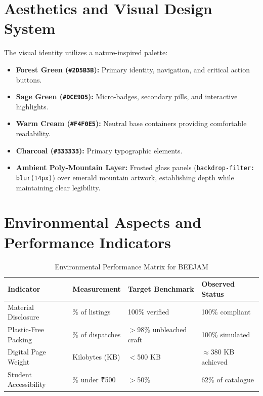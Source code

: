 \documentclass[11pt,a4paper]{article}
\begin{document}
\section{Aesthetics and Visual Design System}
The visual identity utilizes a nature-inspired palette:
\begin{itemize}
    \item \textbf{Forest Green (\texttt{\#2D5B3B}):} Primary identity, navigation, and critical action buttons.
    \item \textbf{Sage Green (\texttt{\#DCE9D5}):} Micro-badges, secondary pills, and interactive highlights.
    \item \textbf{Warm Cream (\texttt{\#F4F0E5}):} Neutral base containers providing comfortable readability.
    \item \textbf{Charcoal (\texttt{\#333333}):} Primary typographic elements.
    \item \textbf{Ambient Poly-Mountain Layer:} Frosted glass panels (\texttt{backdrop-filter: blur(14px)}) over emerald mountain artwork, establishing depth while maintaining clear legibility.
\end{itemize}

\section{Environmental Aspects and Performance Indicators}

\begin{table}[h]
\centering
\small
\begin{tabular}{@{}llll@{}}
\toprule
\textbf{Indicator} & \textbf{Measurement} & \textbf{Target Benchmark} & \textbf{Observed Status} \\ \midrule
Material Disclosure & \% of listings & 100\% verified & 100\% compliant \\
Plastic-Free Packing & \% of dispatches & $>$98\% unbleached craft & 100\% simulated \\
Digital Page Weight & Kilobytes (KB) & $<$500 KB & $\approx$380 KB achieved \\
Student Accessibility & \% under ₹500 & $>$50\% & 62\% of catalogue \\ \bottomrule
\end{tabular}
\caption{Environmental Performance Matrix for BEEJAM}
\end{table}
\end{document}
